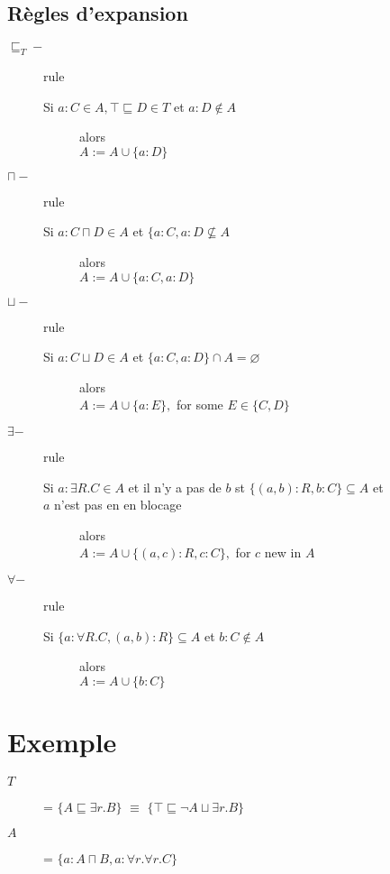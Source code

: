 \subsection{Règles d'expansion}
\begin{description}
\item[$\sqsubseteq_{T} -$] rule\\
\begin{description}
\item[Si $a : C \in A, \top \sqsubseteq D \in T$ et $a : D \notin A$] alors\\ $A := A \cup \{ a : D \}$
\end{description}
\item[$\sqcap -$]rule\\
\begin{description}
\item[Si $a : C \sqcap D \in A$ et $\{ a : C, a : D \nsubseteq A$] alors\\ $A := A \cup \{ a : C, a : D\}$
\end{description}
\item[$\sqcup -$]rule\\
\begin{description}
\item[Si $a : C \sqcup D \in A$ et $\{ a : C, a : D \} \cap A = \varnothing$] alors\\ $A := A \cup \{a : E\},$ for some $E \in \{C,D\}$
\end{description}
\item[$\exists -$]rule\\
\begin{description}
\item[Si $a : \exists R.C \in A$ et il n'y a pas de $b$ st $\{(a,b) : R, b : C\} \subseteq A$ et]
\item[$a $ n'est pas en en blocage] alors\\ $A := A \cup \{(a,c) : R,c : C \},$ for $c$ new in $A$
\end{description}
\item[$\forall -$]rule\\
\begin{description}
\item[Si $\{a : \forall R.C, (a,b) : R\} \subseteq A$ et $b : C \notin A$] alors\\ $A := A \cup \{b : C \}$
\end{description}
\end{description}

\section{Exemple}
\begin{description}
\item[$T$] = $\{ A \sqsubseteq \exists r.B \}$ $\equiv$ $\{\top \sqsubseteq \neg A \sqcup \exists r.B \}$
\item[$A$] = $\{a : A \sqcap B, a : \forall r.\forall r.C \}$
\end{description}

